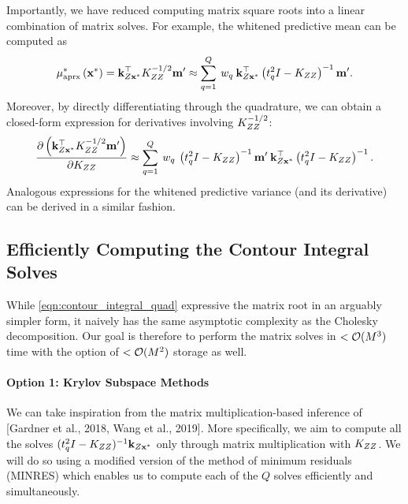 Importantly, we have reduced computing matrix square roots into a linear combination of matrix solves.
For example, the whitened predictive mean can be computed as
\begin{equation}
  \mu^*_\text{aprx} \left( \mathbf{x}^* \right) = \mathbf{k}_{Z\mathbf{x}^*}^\top K_{ZZ}^{-1/2} \mathbf{m}'
  \approx \sum_{q=1}^Q \: w_q \: \mathbf{k}_{Z\mathbf{x}^*}^\top \left( t_q^2 I - K_{ZZ} \right)^{-1} \mathbf{m}'.
  \label{eqn:approx_pred_mean_ciq}
\end{equation}
%
Moreover, by directly differentiating through the quadrature, we can obtain a closed-form expression for derivatives involving $K_{ZZ}^{-1/2}$:
%
\begin{equation}
  \frac{\partial \left( \mathbf{k}_{Z\mathbf{x}^*}^\top K_{ZZ}^{-1/2} \mathbf{m}' \right)} {\partial K_{ZZ}}
  \approx \sum_{q=1}^Q \: w_q \: \left( t_q^2 I - K_{ZZ} \right)^{-1} \mathbf{m}' \: \mathbf{k}_{Z\mathbf{x}^*}^\top \left( t_q^2 I - K_{ZZ} \right)^{-1}.
  \label{eqn:approx_pred_mean_ciq_deriv}
\end{equation}
%
Analogous expressions for the whitened predictive variance (and its derivative) can be derived in a similar fashion.

\subsection{Efficiently Computing the Contour Integral Solves}
%
While \cref{eqn:contour_integral_quad} expressive the matrix root in an arguably simpler form, it naively has the same asymptotic complexity as the Cholesky decomposition.
Our goal is therefore to perform the matrix solves in $< \bigo{M^3}$ time with the option of $< \bigo{M^2}$ storage as well.

\paragraph{Option 1: Krylov Subspace Methods}

We can take inspiration from the matrix multiplication-based inference of [Gardner et al., 2018, Wang et al., 2019].
More specifically, we aim to compute all the solves $(t_q^2 I - K_{ZZ})^{-1} \mathbf{k}_{Z \mathbf{x}^*}$ only through matrix multiplication with $K_{ZZ}$.
We will do so using a modified version of the method of minimum residuals (MINRES) which enables us to compute each of the $Q$ solves efficiently and simultaneously.

